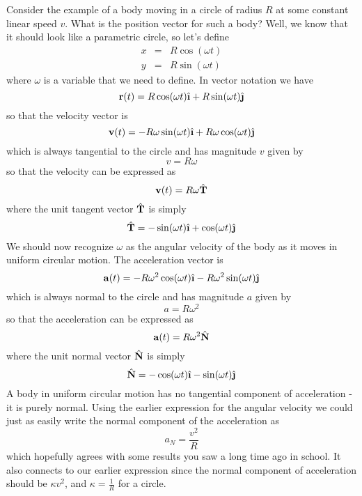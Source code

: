 \documentclass[M3_Night1_Solutions]{subfiles}
\begin{document}
\begin{enumerate}[series=exercises, label=\textbf{Exercise} (\arabic*)]
Consider the example of a body moving in a circle of radius $R$ at some constant linear speed $v$. What is the position vector for such a body? Well, we know that it should look like a parametric circle, so let's define
\begin{eqnarray*}
x &=& R \cos(\omega t) \\
y &=& R \sin(\omega t)
\end{eqnarray*}
where $\omega$ is a variable that we need to define. In vector notation we have
\[\r(t) = R \cos(\omega t) \ihat + R \sin(\omega t) \jhat \]
so that the velocity vector is
\[\v(t) = -R \omega \sin(\omega t) \ihat + R \omega \cos(\omega t) \jhat \]
which is always tangential to the circle and has magnitude $v$ given by
\[v = R \omega \]
so that the velocity can be expressed as
\[\mathbf{v}(t) = R \omega \hat{\mathbf{T}} \]
where the unit tangent vector $\hat{\mathbf{T}}$ is simply
\[\That = -\sin(\omega t) \ihat + \cos(\omega t) \jhat \]
We should now recognize $\omega$ as the angular velocity of the body as it moves in uniform circular motion. The acceleration vector is
\[\a(t) = -R \omega^2 \cos(\omega t) \ihat - R \omega^2 \sin(\omega t) \jhat \]
which is always normal to the circle and has magnitude $a$ given by
\[a = R \omega^2 \]
so that the acceleration can be expressed as
\[\mathbf{a}(t) = R \omega^2 \hat{\mathbf{N}} \]
where the unit normal vector $\hat{\mathbf{N}}$ is simply
\[ \Nhat = -\cos(\omega t) \ihat - \sin(\omega t) \jhat \]
A body in uniform circular motion has no tangential component of acceleration - it is purely normal. Using the earlier expression for the angular velocity we could just as easily write the normal component of the acceleration as
\[a_N = \frac{v^2}{R} \]
which hopefully agrees with some results you saw a long time ago in school. It also connects to our earlier expression since the normal component of acceleration should be $\kappa v^2$, and $\kappa = \frac{1}{R}$ for a circle.


\end{enumerate}
\end{document}
